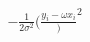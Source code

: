\documentclass[preview]{standalone}
\begin{document}
\begin{align*}
-\frac{1}{2{\sigma}^2}(\frac{y_i -\omega x_i})^2
\end{align*}
\end{document}

